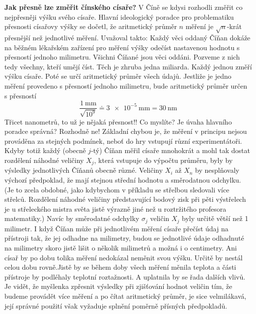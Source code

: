 \begin{mdframed}[style=mdexam]
  \begin{example}\label{mai:exam074}
    \textbf{Jak přesně lze změřit čínského císaře?}\newline
      V Číně se kdysi rozhodli změřit co nejpřesněji výšku svého císaře. Hlavní ideologický poradce
      pro problematiku přesnosti císařovy výšky se dočetl, že aritmetický průměr \(n\) měření je
      \(\sqrt{n}\)-krát přesnější než jednotlivé měření. Uvažoval takto: Každý věci oddaný Číňan
      dokáže na běžném lékařském zařízení pro měření výšky odečíst nastavenou hodnotu s přesností
      jednoho milimetru. Všichni Číňané jsou věci oddáni. Pozveme z nich tedy všechny, kteří umějí
      číst. Těch je zhruba jedna miliarda. Každý jednou změří výšku císaře. Poté se určí aritmetický
      průměr všech údajů. Jestliže je jedno měření provedeno s přesností jednoho milimetru, bude
      aritmetický průměr určen s přesností 
      \begin{equation*}
        \dfrac{\qty{1}{\mm}}{\sqrt{10^9}}\doteq\qty{3e-5}{\mm} = \qty{30}{\nm}
      \end{equation*}
      Třicet nanometrů, to už je nějaká přesnost!! Co myslíte? Je úvaha hlavního poradce správná?
      Rozhodně ne! Základní chybou je, že měření v principu nejsou prováděna za stejných podmínek,
      neboť do hry vstupují různí experimentátoři. Kdyby totiž každý (obecně \(j\)-tý) Číňan měřil
      císaře mnohokrát a mohl tak dostat rozdělení náhodné veličiny \(X_j\), která vstupuje do
      výpočtu průměru, byly by výsledky jednotlivých Číňanů obecně různé. Veličiny \(X_i\) až
      \(X_n\) by nesplňovaly výchozí předpoklad, že mají stejnou střední hodnotu a směrodatnou
      odchylku. (Je to zcela obdobné, jako kdybychom v příkladu se střelbou sledovali více střelců.
      Rozdělení náhodné veličiny představující bodový zisk při pěti výstřelech je u střeleckého
      mistra světa jistě výrazně jiné než u roztržitého profesora matematiky.) Navíc by směrodatné
      odchylky \(\sigma_j\) veličin \(X_j\) byly určitě větší než 1 milimetr. I když Číňan může při
      jednotlivém měření císaře přečíst údaj na přístroji tak, že jej odhadne na milimetry, budou se
      jednotlivé údaje odhadnuté na milimetry skoro jistě lišit o několik milimetrů a možná i o
      centimetry. Ani císař by po dobu tolika měření nedokázal neměnit svou výšku. Určitě by nestál
      celou dobu rovně.Jistě by se během doby všech měření měnila teplota a části přístroje by
      podléhaly teplotní roztažnosti. A uplatnila by se řada dalších vlivů. Je vidět, že myšlenka
      zpřesnit výsledky při zjišťování hodnot veličin tím, že budeme provádět více měření a po čítat
      aritmetický průměr, je sice velmilákavá, její správné použití však vyžaduje splnění poměrně
      přísných předpokladů.
      

\end{example}
\end{mdframed}
